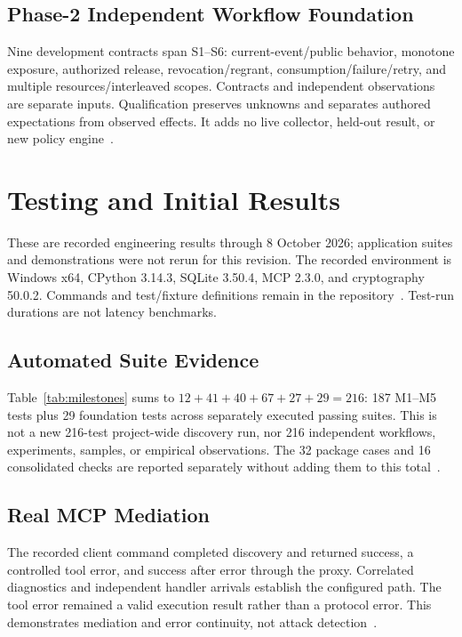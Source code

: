 \documentclass[conference]{IEEEtran}
\begin{document}
\subsection{Phase-2 Independent Workflow Foundation}
Nine development contracts span S1--S6: current-event/public behavior, monotone exposure, authorized release, revocation/regrant, consumption/failure/retry, and multiple resources/interleaved scopes. Contracts and independent observations are separate inputs. Qualification preserves unknowns and separates authored expectations from observed effects. It adds no live collector, held-out result, or new policy engine~\cite{cgprotocol,cgresults}.

\section{Testing and Initial Results}
These are recorded engineering results through 8 October 2026; application suites and demonstrations were not rerun for this revision. The recorded environment is Windows x64, CPython 3.14.3, SQLite 3.50.4, MCP 2.3.0, and cryptography 50.0.2. Commands and test/fixture definitions remain in the repository~\cite{cgrepo,cgresults}. Test-run durations are not latency benchmarks.

\subsection{Automated Suite Evidence}
Table~\ref{tab:milestones} sums to $12+41+40+67+27+29=216$: 187 M1--M5 tests plus 29 foundation tests across separately executed passing suites. This is not a new 216-test project-wide discovery run, nor 216 independent workflows, experiments, samples, or empirical observations. The 32 package cases and 16 consolidated checks are reported separately without adding them to this total~\cite{cgresults}.

\subsection{Real MCP Mediation}
The recorded client command completed discovery and returned success, a controlled tool error, and success after error through the proxy. Correlated diagnostics and independent handler arrivals establish the configured path. The tool error remained a valid execution result rather than a protocol error. This demonstrates mediation and error continuity, not attack detection~\cite{cgresults,cgrepo}.
\end{document}

